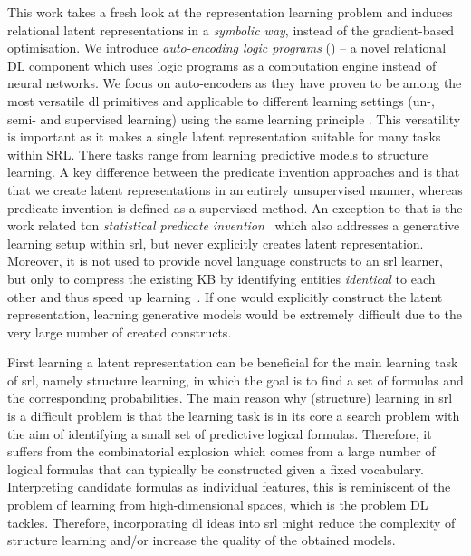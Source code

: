 This work takes a fresh look at the representation learning problem and induces relational latent representations in a \textit{symbolic way}, instead of the gradient-based optimisation.
We introduce \textit{auto-encoding logic programs} () -- a novel relational DL component which uses logic programs as a computation engine instead of neural networks.
We focus on auto-encoders as they have proven to be among the most versatile \gls{dl} primitives and applicable to different learning settings (un-, semi- and supervised learning) using the same learning principle \cite{SSLVAE2014,VincentDaE,Kingma2014,BengioSAE}.
This versatility is important as it makes a single latent representation suitable for many tasks within SRL.
There tasks range from learning predictive models to structure learning.
A key difference between the predicate invention approaches and  is that that we create latent representations in an entirely unsupervised manner, whereas predicate invention is defined as a supervised method.
An exception to that is the work related ton \textit{statistical predicate invention}~\cite{Kok2007} which also addresses a generative learning setup within \gls{srl}, but never explicitly creates latent representation.
Moreover, it is not used to provide novel language constructs to an \gls{srl} learner, but only to compress the existing KB by identifying entities \textit{identical} to each other and thus speed up learning~\cite{Kok:2009:LML:1553374.1553440}.
If one would explicitly construct the latent representation, learning generative models would be extremely difficult due to the very large number of created constructs.




First learning a latent representation can be beneficial for the main learning task of \gls{srl}, namely structure learning, in which the goal is to find a set of formulas and the corresponding probabilities.
The main reason why (structure) learning in \gls{srl} is a difficult problem is that the learning task is in its core a search problem with the aim of identifying a small set of predictive logical formulas.
Therefore, it suffers from the combinatorial explosion which comes from a large number of logical formulas that can typically be constructed given a fixed vocabulary.
Interpreting candidate formulas as individual features, this is reminiscent of the problem of learning from high-dimensional spaces, which is the problem DL tackles.
Therefore, incorporating \gls{dl} ideas into \gls{srl} might reduce the complexity of structure learning and/or increase the quality of the obtained models.


